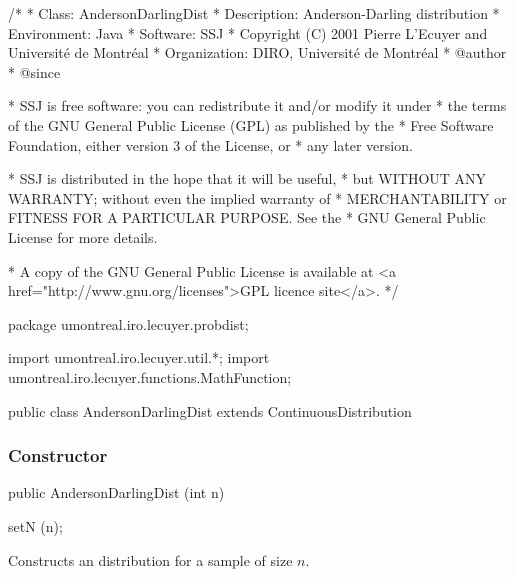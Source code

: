 \begin{code}
\begin{hide}
/*
 * Class:        AndersonDarlingDist
 * Description:  Anderson-Darling distribution
 * Environment:  Java
 * Software:     SSJ 
 * Copyright (C) 2001  Pierre L'Ecuyer and Université de Montréal
 * Organization: DIRO, Université de Montréal
 * @author       
 * @since

 * SSJ is free software: you can redistribute it and/or modify it under
 * the terms of the GNU General Public License (GPL) as published by the
 * Free Software Foundation, either version 3 of the License, or
 * any later version.

 * SSJ is distributed in the hope that it will be useful,
 * but WITHOUT ANY WARRANTY; without even the implied warranty of
 * MERCHANTABILITY or FITNESS FOR A PARTICULAR PURPOSE.  See the
 * GNU General Public License for more details.

 * A copy of the GNU General Public License is available at
   <a href="http://www.gnu.org/licenses">GPL licence site</a>.
 */
\end{hide}
package umontreal.iro.lecuyer.probdist;
\begin{hide}
import umontreal.iro.lecuyer.util.*;
import umontreal.iro.lecuyer.functions.MathFunction;
\end{hide} 

public class AndersonDarlingDist extends ContinuousDistribution\begin{hide} {
   protected int n;

   private static class Function implements MathFunction {
      protected int n;
      protected double u;

      public Function (int n, double u) {
         this.n = n;
         this.u = u;
      }

      public double evaluate (double x) {
         return u - cdf(n,x);
      }
   }
\end{hide}
\end{code}
\subsubsection* {Constructor}

\begin{code}

   public AndersonDarlingDist (int n)\begin{hide} {
      setN (n);
   }\end{hide}
\end{code}
\begin{tabb}
   Constructs an \ad{} distribution for a sample of size $n$.
\end{tabb}


